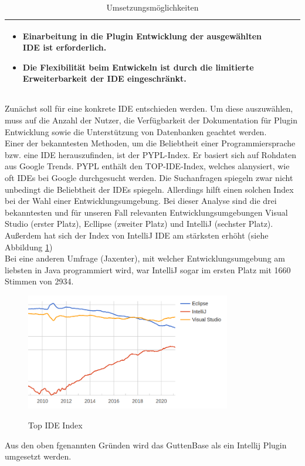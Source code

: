 \begin{table}
\begin{tabular}{ |p{3cm}|p{6cm}|p{6cm}| }
			\begin{itemize}
				\item Einarbeitung in die Plugin Entwicklung der ausgewählten IDE ist erforderlich.
				\item Die Flexibilität beim Entwickeln ist durch die limitierte Erweiterbarkeit der IDE eingeschränkt.
			\end{itemize} \\
			\hline
		
		\end{tabular}
	\caption{Umsetzungsmöglichkeiten}
	\label{table:tool-options}
\end{table}

Zunächst soll für eine konkrete IDE entschieden werden. Um diese auszuwählen, muss auf die Anzahl der Nutzer, die Verfügbarkeit der Dokumentation für Plugin Entwicklung sowie die Unterstützung von Datenbanken geachtet werden.\\
Einer der bekanntesten Methoden, um die Beliebtheit einer Programmiersprache bzw. eine IDE herauszufinden, ist der PYPL-Index. Er basiert sich auf Rohdaten aus Google Trends. PYPL enthält den TOP-IDE-Index, welches alanysiert, wie oft IDEs bei Google durchgesucht werden. Die Suchanfragen spiegeln zwar nicht unbedingt die Beliebtheit der IDEs spiegeln. Allerdings hilft einen solchen Index bei der Wahl einer Entwicklungsumgebung.
Bei dieser Analyse sind die drei bekanntesten und für unseren Fall relevanten Entwicklungsumgebungen Visual Studio (erster Platz), Ecllipse (zweiter Platz) und IntelliJ (sechster Platz). Außerdem hat sich der Index von IntelliJ IDE am stärksten erhöht (siehe Abbildung \ref{img:ide-index})\\
Bei eine anderen Umfrage (Jaxenter), mit welcher Entwicklungsumgebung am liebsten in Java programmiert wird, war IntelliJ sogar im ersten Platz mit 1660 Stimmen von 2934. \\

\begin{figure}[h]
	\caption{Top IDE Index}
	\centering
	\includegraphics[width=0.8\textwidth]{images/ide-index}
	\label{img:ide-index}
\end{figure}
Aus den oben fgenannten Gründen wird das GuttenBase als ein Intellij Plugin umgesetzt werden. 

